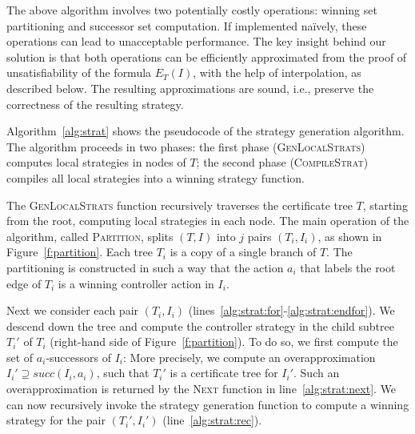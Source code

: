 The above algorithm involves two potentially costly 
operations: winning set partitioning and successor set 
computation.  If implemented na\"ively, these operations can lead 
to unacceptable performance.  The key insight behind our solution 
is that both operations can be efficiently approximated from the 
proof of unsatisfiability of the formula $E_T(I)$, with the help 
of interpolation, as described below.  The resulting 
approximations are sound, i.e., preserve the correctness of the 
resulting strategy.

Algorithm~\ref{alg:strat} shows the pseudocode of the 
strategy generation algorithm.  The algorithm proceeds in two 
phases: the first phase (\textsc{GenLocalStrats}) computes local 
strategies in nodes of $T$; the second phase 
(\textsc{CompileStrat}) compiles all local strategies into a 
winning strategy function.

The \textsc{GenLocalStrats} function recursively traverses the
certificate tree $T$, starting from the root, computing local
strategies in each node.
The main operation of the algorithm, called \textsc{Partition},
splits $(T,I)$ into $j$ pairs $(T_i, I_i)$, as shown in
Figure~\ref{f:partition}.  Each tree $T_i$ is a copy of a single
branch of $T$.  The partitioning is constructed in such a way that
the action $a_i$ that labels the root edge of $T_i$ is a winning
controller action in $I_i$.



Next we consider each pair $(T_i, I_i)$
(lines~\ref{alg:strat:for}-\ref{alg:strat:endfor}). We descend
down the tree and compute the controller strategy in the child
subtree $T_i'$ of $T_i$ (right-hand side of Figure~\ref{f:partition}).
To do so, we first compute the set of $a_i$-successors of $I_i$:
More precisely, we compute an overapproximation $I_i'\supseteq
succ(I_i, a_i)$, such that $T_i'$ is a certificate
tree for $I_i'$.  Such an overapproximation is returned by the
\textsc{Next} function in line~\ref{alg:strat:next}.  We can now
recursively invoke the strategy generation function to compute a
winning strategy for the pair $(T_i', I_i')$
(line~\ref{alg:strat:rec}).

